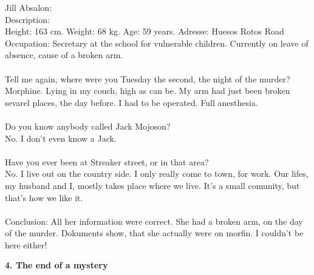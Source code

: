 \documentclass[]{article}
\begin{document}
Jill Absalon: \\
Description: \\ Height: 163 cm. Weight: 68 kg. Age: 59 years. Adresse: Huesos Rotos Road Occupation: Secretary at the school for vulnerable children. Currently on leave of absence, cause of a broken arm.
\\ \\
Tell me again, where were you Tuesday the second, the night of the murder? \\
Morphine. Lying in my couch, high as can be. My arm had just been broken sevarel places, the day before. I had to be operated. Full anesthesia.
\\ \\
Do you know anybody called Jack Mojoson? \\
No. I don't even know a Jack. 
\\ \\
Have you ever been at Streaker street, or in that area? \\ 
No. I live out on the country side. I only really come to town, for work. Our lifes, my husband and I, mostly takes place where we live. It's a small comunity, but that's how we like it.
\\ \\
Conclusion: All her information were correct. She had a broken arm, on the day of the murder. Dokuments show, that she actually were on morfin. I couldn't be here either!

\begin{center}
	\large\textbf{4. The end of a mystery}
\end{center}
\end{document}
